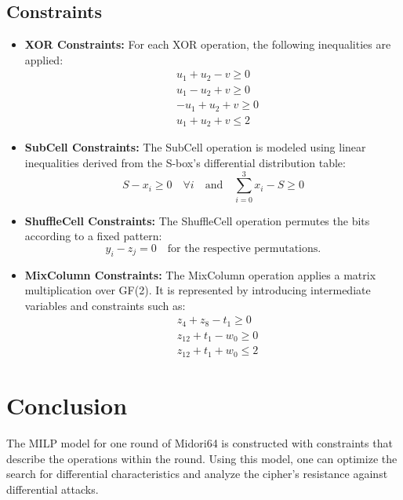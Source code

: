 \documentclass[10pt, a4paper]{article}
\begin{document}
\subsection*{Constraints}
\begin{itemize}
    \item \textbf{XOR Constraints:} For each XOR operation, the following inequalities are applied:
    \begin{equation}
        \begin{aligned}
            & u_1 + u_2 - v \geq 0 \\
            & u_1 - u_2 + v \geq 0 \\
            & -u_1 + u_2 + v \geq 0 \\
            & u_1 + u_2 + v \leq 2
        \end{aligned}
    \end{equation}

    \item \textbf{SubCell Constraints:} The SubCell operation is modeled using linear inequalities derived from the S-box's differential distribution table:
    \begin{equation}
        S - x_i \geq 0 \quad \forall i \quad \text{and} \quad \sum_{i=0}^{3} x_i - S \geq 0
    \end{equation}

    \item \textbf{ShuffleCell Constraints:} The ShuffleCell operation permutes the bits according to a fixed pattern:
    \begin{equation}
        y_i - z_j = 0 \quad \text{for the respective permutations.}
    \end{equation}

    \item \textbf{MixColumn Constraints:} The MixColumn operation applies a matrix multiplication over GF(2). It is represented by introducing intermediate variables and constraints such as:
    \begin{equation}
        \begin{aligned}
            & z_4 + z_8 - t_1 \geq 0 \\
            & z_{12} + t_1 - w_0 \geq 0 \\
            & z_{12} + t_1 + w_0 \leq 2
        \end{aligned}
    \end{equation}
\end{itemize}

\section*{Conclusion}
The MILP model for one round of Midori64 is constructed with constraints that describe the operations within the round. Using this model, one can optimize the search for differential characteristics and analyze the cipher's resistance against differential attacks.
\end{document}
